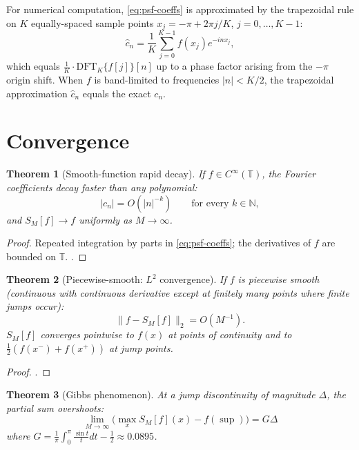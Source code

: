 \documentclass[11pt,a4paper]{article}
\theoremstyle{definition}
\theoremstyle{plain}
\newtheorem{theorem}{Theorem}
\begin{document}
For numerical computation, \eqref{eq:psf-coeffs} is approximated by the
trapezoidal rule on $K$ equally-spaced sample points
$x_j = -\pi + 2\pi j/K$, $j = 0, \ldots, K-1$:
\begin{equation}
\label{eq:psf-trapezoidal}
\hat{c}_n = \frac{1}{K} \sum_{j=0}^{K-1} f(x_j) e^{-i n x_j},
\end{equation}
which equals $\frac{1}{K} \cdot \mathrm{DFT}_K\{f[j]\}[n]$ up to a phase factor
arising from the $-\pi$ origin shift. When $f$ is band-limited to frequencies
$|n| < K/2$, the trapezoidal approximation $\hat{c}_n$ equals the exact $c_n$.

\section{Convergence}

\begin{theorem}[Smooth-function rapid decay]
\label{thm:smooth-conv}
If $f \in C^\infty(\mathbb{T})$, the Fourier coefficients decay faster than
any polynomial:
\begin{equation}
|c_n| = O(|n|^{-k}) \qquad \text{for every } k \in \mathbb{N},
\end{equation}
and $S_M[f] \to f$ uniformly as $M \to \infty$.
\end{theorem}

\begin{proof}
Repeated integration by parts in \eqref{eq:psf-coeffs}; the derivatives of
$f$ are bounded on $\mathbb{T}$. \cite[Ch.~5]{Korner1989}.
\end{proof}

\begin{theorem}[Piecewise-smooth: $L^2$ convergence]
\label{thm:piecewise-conv}
If $f$ is piecewise smooth (continuous with continuous derivative except at
finitely many points where finite jumps occur):
\begin{equation}
\label{eq:l2-conv}
\| f - S_M[f] \|_2 = O(M^{-1}).
\end{equation}
$S_M[f]$ converges pointwise to $f(x)$ at points of continuity and to
$\frac{1}{2}(f(x^-) + f(x^+))$ at jump points.
\end{theorem}

\begin{proof}
\cite[Ch.~12]{Korner1989}.
\end{proof}

\begin{theorem}[Gibbs phenomenon]
\label{thm:gibbs}
At a jump discontinuity of magnitude $\Delta$, the partial sum overshoots:
\begin{equation}
\label{eq:gibbs}
\lim_{M \to \infty} \big( \max_x S_M[f](x) - f(\sup) \big) = G \Delta
\end{equation}
where $G = \frac{1}{\pi}\int_0^\pi \frac{\sin t}{t} dt - \frac{1}{2} \approx 0.0895$.
\end{theorem}
\end{document}
